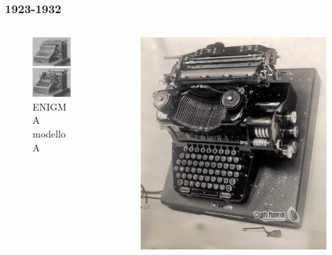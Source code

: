 	\begin{frame}
		\frametitle{1923-1932}
		\begin{columns}
			\begin{column}{0.45\textwidth}
				\begin{figure}
					\centering
					\includegraphics[scale=0.4]{img/A}
					\caption{ENIGMA modello A}
				\end{figure}
			\end{column}
			\begin{column}{0.45\textwidth}
				\begin{figure}
					\centering
					\includegraphics[scale=0.1]{img/B}

\end{figure}
\end{column}
\end{columns}
\end{frame}

